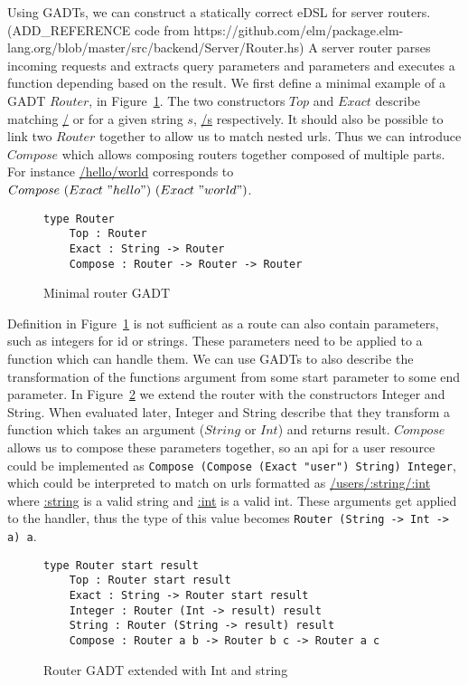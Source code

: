 Using GADTs, we can construct a statically correct eDSL for server
routers.(ADD\_REFERENCE code from
https://github.com/elm/package.elm-lang.org/blob/master/src/backend/Server/Router.hs)
A server router parses incoming requests and extracts query parameters and
parameters and executes a function depending based on the result. We first
define a minimal example of a GADT $Router$, in Figure~\ref{routergadtminimal}.
The two constructors $Top$ and $Exact$ describe matching \url{/} or for a given
string $s$, \url{/s} respectively. It should also be possible to link two
$Router$ together to allow us to match nested urls. Thus we can introduce
$Compose$ which allows composing routers together composed of multiple parts.
For instance \url{/hello/world} corresponds to $Compose\ (Exact\ "hello")\
(Exact\ "world")$.

\begin{figure}[H]
    \begin{lstlisting}
type Router 
    Top : Router 
    Exact : String -> Router 
    Compose : Router -> Router -> Router
    \end{lstlisting}
    \caption{Minimal router GADT}
    \label{routergadtminimal}
\end{figure}


Definition in Figure~\ref{routergadtminimal} is not sufficient as a route can
also contain parameters, such as integers for id or strings.  These parameters
need to be applied to a function which can handle them. We can use GADTs to also
describe the transformation of the functions argument from some start parameter
to some end parameter. In Figure~\ref{extendedrouter} we extend the router with the
constructors Integer and String. When evaluated later, Integer and String
describe that they transform a function which takes an argument ($String$ or
$Int$) and returns result. $Compose$ allows us to compose these parameters
together, so an api for a user resource could be implemented as \texttt{Compose
(Compose (Exact "user") String) Integer}, which could be interpreted to match on
urls formatted as \url{/users/:string/:int} where \url{:string} is a valid
string and \url{:int} is a valid int. These arguments get applied to the
handler, thus the type of this value becomes \texttt{Router (String -> Int -> a)
a}.

\begin{figure}[H]
    \begin{lstlisting}
type Router start result 
    Top : Router start result
    Exact : String -> Router start result
    Integer : Router (Int -> result) result
    String : Router (String -> result) result
    Compose : Router a b -> Router b c -> Router a c
    \end{lstlisting}
    \caption{Router GADT extended with Int and string}
    \label{extendedrouter}
\end{figure}

